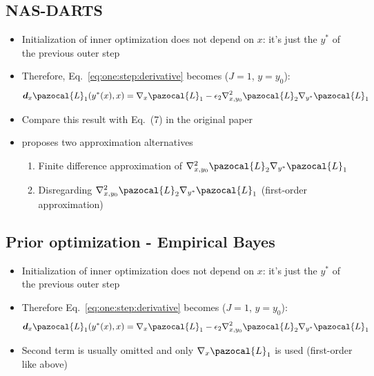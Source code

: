\subsection{NAS-DARTS}
\begin{itemize}
	\item Initialization of inner optimization does not depend on $x$: it's just the $y^*$ of the previous outer step
	\item Therefore, Eq.~\eqref{eq:one:step:derivative} becomes ($J = 1$, $y=y_0$):
	\begin{equation}
		\boldsymbol{d}_x\pazocal{L}_1(y^*(x), x) = \nabla_x \pazocal{L}_1 - \epsilon_2 \nabla_{x,y_0}^2\pazocal{L}_2\nabla_{y^*}\pazocal{L}_1 
	\end{equation}	
	\item Compare this result with Eq.~(7) in the original paper \textcite{liu2019darts}
	\item \textcite{liu2019darts} proposes two approximation alternatives
	\begin{enumerate}
		\item Finite difference approximation of $\nabla_{x,y_0}^2\pazocal{L}_2\nabla_{y^*}\pazocal{L}_1 $
		\item Disregarding $\nabla_{x,y_0}^2\pazocal{L}_2\nabla_{y^*}\pazocal{L}_1 $ (first-order approximation)
	\end{enumerate}
\end{itemize}

\subsection{Prior optimization - Empirical Bayes}
\begin{itemize}
	\item Initialization of inner optimization does not depend on $x$: it's just the $y^*$ of the previous outer step
	\item Therefore Eq.~\eqref{eq:one:step:derivative} becomes ($J = 1$, $y=y_0$):
	\begin{equation}
		\boldsymbol{d}_x\pazocal{L}_1(y^*(x), x) = \nabla_x \pazocal{L}_1 - \epsilon_2 \nabla_{x,y_0}^2\pazocal{L}_2\nabla_{y^*}\pazocal{L}_1 
	\end{equation}	
	\item Second term is usually omitted and only $\nabla_x \pazocal{L}_1$ is used (first-order like above)
\end{itemize}

